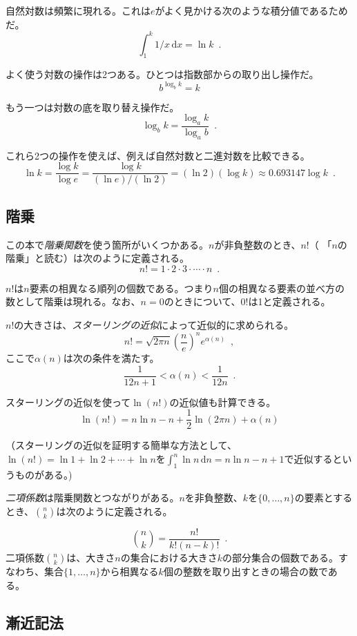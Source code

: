 自然対数は頻繁に現れる。これは$e$がよく見かける次のような積分値であるためだ。
\[
    \int_{1}^{k} 1/x\,\mathrm{d}x  = \ln k \enspace .
\]

よく使う対数の操作は2つある。ひとつは指数部からの取り出し操作だ。
\[
    b^{\log_b k} = k
\]

もう一つは対数の底を取り替え操作だ。
\[
    \log_b k = \frac{\log_a k}{\log_a b} \enspace .
\]

これら2つの操作を使えば、例えば自然対数と二進対数を比較できる。
\[
   \ln k = \frac{\log k}{\log e} = \frac{\log k}{(\ln e)/(\ln 2)} =
    (\ln 2)(\log k) \approx 0.693147\log k \enspace .
\]

\subsection{階乗}

この本で\emph{階乗関数}を使う箇所がいくつかある。$n$が非負整数のとき、$n!$（ 「$n$の階乗」と読む）は次のように定義される。
\[
   n! = 1\cdot2\cdot3\cdot\cdots\cdot n \enspace .
\]

$n!$は$n$要素の相異なる順列の個数である。つまり$n$個の相異なる要素の並べ方の数として階乗は現れる。なお、$n=0$のときについて、$0!$は1と定義される。

%
$n!$の大きさは、\emph{スターリングの近似}によって近似的に求められる。
\[
	n!
   = \sqrt{2\pi n}\left(\frac{n}{e}\right)^{n}e^{\alpha(n)} \enspace ,
\]
ここで$\alpha(n)$は次の条件を満たす。
\[
   \frac{1}{12n+1} <  \alpha(n) < \frac{1}{12n}  \enspace .
\]

スターリングの近似を使って$\ln(n!)$の近似値も計算できる。
\[
   \ln(n!) = n\ln n - n + \frac{1}{2}\ln(2\pi n) + \alpha(n)
\]

（スターリングの近似を証明する簡単な方法として、$\ln(n!)=\ln 1 + \ln 2  + \cdots + \ln n$を$\int_1^n \ln n\,\mathrm{d}n = n\ln n - n +1$で近似するというものがある。)

%
\emph{二項係数}は階乗関数とつながりがある。$n$を非負整数、$k$を$\{0,\ldots,n\}$の要素とするとき、$\binom{n}{k}$は次のように定義される。

\[
   \binom{n}{k} = \frac{n!}{k!(n-k)!} \enspace .
\]
二項係数$\binom{n}{k}$は、大きさ$n$の集合における大きさ$k$の部分集合の個数である。すなわち、集合$\{1,\ldots,n\}$から相異なる$k$個の整数を取り出すときの場合の数である。

\subsection{漸近記法}

